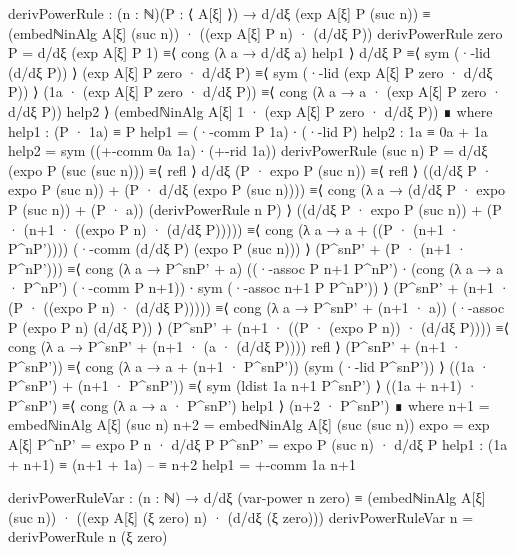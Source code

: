     derivPowerRule : (n : ℕ)(P : ⟨ A[ξ] ⟩) → d/dξ (exp A[ξ] P (suc n)) ≡ (embedℕinAlg A[ξ] (suc n)) · ((exp A[ξ] P n) · (d/dξ P))
    derivPowerRule zero P = d/dξ (exp A[ξ] P 1) ≡⟨ cong (λ a → d/dξ a) help1 ⟩ 
                  d/dξ P ≡⟨ sym (·-lid (d/dξ P)) ⟩ 
                  (exp A[ξ] P zero · d/dξ P) ≡⟨ sym (·-lid (exp A[ξ] P zero · d/dξ P)) ⟩
                  (1a ·  (exp A[ξ] P zero · d/dξ P)) ≡⟨ cong (λ a → a · (exp A[ξ] P zero · d/dξ P)) help2 ⟩
                  (embedℕinAlg A[ξ] 1 · (exp A[ξ] P zero · d/dξ P)) ∎
      where
        help1 : (P · 1a) ≡ P
        help1 = (·-comm P 1a) ∙ (·-lid P)
        help2 : 1a ≡ 0a + 1a
        help2 = sym ((+-comm 0a 1a) ∙ (+-rid 1a))
    derivPowerRule (suc n) P = d/dξ (expo P (suc (suc n))) ≡⟨ refl ⟩   
                     d/dξ (P · expo P (suc n)) ≡⟨ refl ⟩  
                     ((d/dξ P · expo P (suc n)) + (P · d/dξ (expo P (suc n)))) ≡⟨ cong (λ a → (d/dξ P · expo P (suc n)) + (P · a)) (derivPowerRule n P) ⟩  
                     ((d/dξ P · expo P (suc n)) + (P · (n+1 · ((expo P n) · (d/dξ P))))) ≡⟨ cong (λ a → a + ((P · (n+1 · P^nP')))) (·-comm (d/dξ P) (expo P (suc n))) ⟩  
                     (P^snP' + (P · (n+1 · P^nP'))) ≡⟨ cong (λ a → P^snP' + a) ((·-assoc P n+1 P^nP') ∙ 
                                                                                (cong (λ a → a · P^nP') (·-comm P n+1)) ∙ 
                                                                                sym (·-assoc n+1 P P^nP')) ⟩
                     (P^snP' + (n+1 · (P · ((expo P n) · (d/dξ P))))) ≡⟨ cong (λ a → P^snP' + (n+1 · a))  (·-assoc P (expo P n) (d/dξ P)) ⟩  
                     (P^snP' + (n+1 · ((P · (expo P n)) · (d/dξ P)))) ≡⟨ cong (λ a → P^snP' + (n+1 · (a · (d/dξ P)))) refl ⟩
                     (P^snP' + (n+1 · P^snP')) ≡⟨ cong (λ a → a + (n+1 · P^snP')) (sym (·-lid P^snP')) ⟩
                     ((1a · P^snP') + (n+1 · P^snP')) ≡⟨ sym (ldist 1a n+1 P^snP') ⟩  
                     ((1a + n+1) · P^snP') ≡⟨ cong (λ a → a · P^snP') help1 ⟩
                     (n+2 · P^snP') ∎
      where
        n+1 = embedℕinAlg A[ξ] (suc n)
        n+2 = embedℕinAlg A[ξ] (suc (suc n))
        expo = exp A[ξ]
        P^nP' = expo P n · d/dξ P
        P^snP' = expo P (suc n) · d/dξ P
        help1 : (1a + n+1) ≡ (n+1 + 1a) -- ≡ n+2
        help1 = +-comm 1a n+1
    
    derivPowerRuleVar : (n : ℕ) → d/dξ (var-power n zero) ≡ (embedℕinAlg A[ξ] (suc n)) · ((exp A[ξ] (ξ zero) n) · (d/dξ (ξ zero)))
    derivPowerRuleVar n = derivPowerRule n (ξ zero)




  